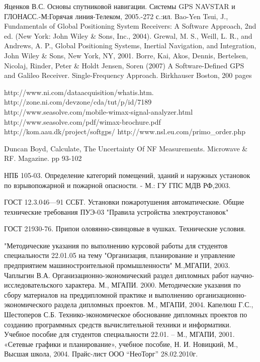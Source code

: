 
\begin{thebibliography}{99}
 Яценков В.С. Основы спутниковой навигации. Системы GPS NAVSTAR и ГЛОНАСС.-М:Горячая линия-Телеком, 2005.-272 с.:ил.
 Bao-Yen Tsui, J., Fundamentals of Global Positioning System Receivers: A Software Approach, 2nd ed. (New York: John Wiley \& Sons, Inc., 2004).
 Grewal, M. S., Weill, L. R., and Andrews, A. P., Global Positioning Systems, Inertial Navigation, and Integration, John Wiley \& Sons, New York, NY, 2001.
 Borre, Kai, Akos, Dennis, Bertelsen, Nicolaj, Rinder, Peter \& Holdt Jensen, Soren (2007) A Software-Defined GPS and Galileo Receiver. Single-Frequency Approach. Birkhauser Boston, 200 pages

 http://www.ni.com/dataacquisition/whatis.htm.
 http://zone.ni.com/devzone/cda/tut/p/id/7189
 http://www.seasolve.com/mobile-wimax-signal-analyzer.html
 http://www.seasolve.com/pdf/wimax-brochure.pdf
 http://kom.aau.dk/project/softgps/
 http://www.nsl.eu.com/primo\_order.php

 Duncan Boyd,  Calculate, The Uncertainty Of NF Measurements. Microwave \& RF. Magazine. pp 93-102



 НПБ 105-03. Определение категорий помещений, зданий и наружных установок по
взрывопожарной и пожарной опасности. - М.: ГУ ГПС МДВ РФ,2003.

 ГОСТ 12.3.046—91 ССБТ. Установки пожаротушения автоматические. Общие технические требования 
 ПУЭ-03 "Правила устройства электроустановок"

 ГОСТ 21930-76. Припои оловянно-свинцовые в чушках. Технические условия.

 "Методические указания по выполнению курсовой работы для студентов специальности 22.01.05
	на тему "Организация, планирование и управление предприятием машиностроительной промышленности" М.,МГАПИ, 2003.
 Чаплыгин В.А. Организационно-экономический раздел дипломных работ научно-исследовательского характера. М., МГАПИ. 2000.
 Методические указания по сбору материалов на преддипломной практике и выполнению организационно-экономического
	раздела дипломных проектов. М., МГАПИ, 2004.
 Капелюш Г.С., Шестоперов С.Б. Технико-экономическое обоснование дипломных проектов по созданию программных средств
	вычислительной техники и информатики. Учебное пособие для студентов специальности 22.01. – М., МГАПИ, 2001.
 «Сетевые графики и планирование», учебное пособие, Н. И. Новицкий, М., Высшая школа, 2004.
 Прайс-лист ООО “НеоТорг” 28.02.2010г.


\end{thebibliography}
